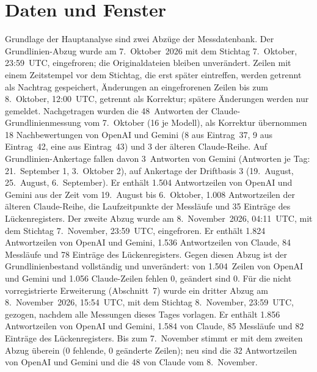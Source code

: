 \documentclass[11pt]{article}
\begin{document}
\section{Daten und Fenster}

Grundlage der Hauptanalyse sind zwei Abzüge der Messdatenbank. Der Grundlinien-Abzug wurde am 7.~Oktober~2026 mit dem Stichtag 7.~Oktober, 23:59~UTC, eingefroren; die Originaldateien bleiben unverändert. Zeilen mit einem Zeitstempel vor dem Stichtag, die erst später eintreffen, werden getrennt als Nachtrag gespeichert, Änderungen an eingefrorenen Zeilen bis zum 8.~Oktober, 12:00~UTC, getrennt als Korrektur; spätere Änderungen werden nur gemeldet. Nachgetragen wurden die 48~Antworten der Claude-Grundlinienmessung vom 7.~Oktober (16 je Modell), als Korrektur übernommen 18 Nachbewertungen von OpenAI und Gemini (8 aus Eintrag~37, 9 aus Eintrag~42, eine aus Eintrag~43) und 3 der älteren Claude-Reihe. Auf Grundlinien-Ankertage fallen davon 3~Antworten von Gemini (Antworten je Tag: 21.~September 1, 3.~Oktober 2), auf Ankertage der Driftbasis 3 (19.~August, 25.~August, 6.~September). Er enthält 1.504 Antwortzeilen von OpenAI und Gemini aus der Zeit vom 19.~August bis 6.~Oktober, 1.008 Antwortzeilen der älteren Claude-Reihe, die Laufzeitpunkte der Messläufe und 35 Einträge des Lückenregisters. Der zweite Abzug wurde am 8.~November~2026, 04:11~UTC, mit dem Stichtag 7.~November, 23:59~UTC, eingefroren. Er enthält 1.824 Antwortzeilen von OpenAI und Gemini, 1.536 Antwortzeilen von Claude, 84 Messläufe und 78 Einträge des Lückenregisters. Gegen diesen Abzug ist der Grundlinienbestand vollständig und unverändert: von 1.504~Zeilen von OpenAI und Gemini und 1.056 Claude-Zeilen fehlen 0, geändert sind 0. Für die nicht vorregistrierte Erweiterung (Abschnitt~7) wurde ein dritter Abzug am 8.~November~2026, 15:54~UTC, mit dem Stichtag 8.~November, 23:59~UTC, gezogen, nachdem alle Messungen dieses Tages vorlagen. Er enthält 1.856 Antwortzeilen von OpenAI und Gemini, 1.584 von Claude, 85 Messläufe und 82 Einträge des Lückenregisters. Bis zum 7.~November stimmt er mit dem zweiten Abzug überein (0 fehlende, 0 geänderte Zeilen); neu sind die 32 Antwortzeilen von OpenAI und Gemini und die 48 von Claude vom 8.~November.
\end{document}

